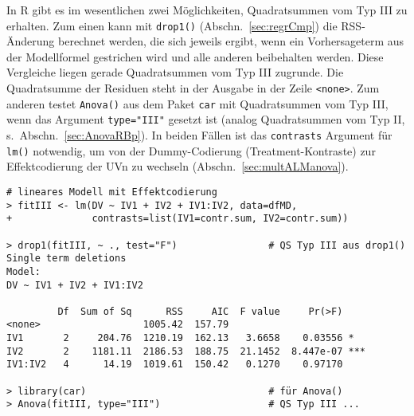 In R gibt es im wesentlichen zwei Möglichkeiten, Quadratsummen vom Typ III zu erhalten. Zum einen kann mit \lstinline!drop1()! (Abschn.\ \ref{sec:regrCmp}) die RSS-Änderung berechnet werden, die sich jeweils ergibt, wenn ein Vorhersageterm aus der Modellformel gestrichen wird und alle anderen beibehalten werden. Diese Vergleiche liegen gerade Quadratsummen vom Typ III zugrunde. Die Quadratsumme der Residuen steht in der Ausgabe in der Zeile \lstinline!<none>!. Zum anderen testet \lstinline!Anova()! aus dem Paket \lstinline!car! mit Quadratsummen vom Typ III, wenn das Argument \lstinline!type="III"! gesetzt ist (analog Quadratsummen vom Typ II, s.\ Abschn.\ \ref{sec:AnovaRBp}). In beiden Fällen ist das \lstinline!contrasts! Argument für \lstinline!lm()! notwendig, um von der Dummy-Codierung (Treatment-Kontraste) zur Effektcodierung der UVn zu wechseln (Abschn.\ \ref{sec:multALManova}).
\begin{lstlisting}
# lineares Modell mit Effektcodierung
> fitIII <- lm(DV ~ IV1 + IV2 + IV1:IV2, data=dfMD,
+              contrasts=list(IV1=contr.sum, IV2=contr.sum))

> drop1(fitIII, ~ ., test="F")                # QS Typ III aus drop1()
Single term deletions
Model:
DV ~ IV1 + IV2 + IV1:IV2

         Df  Sum of Sq      RSS     AIC  F value     Pr(>F)
<none>                  1005.42  157.79
IV1       2     204.76  1210.19  162.13   3.6658    0.03556 *
IV2       2    1181.11  2186.53  188.75  21.1452  8.447e-07 ***
IV1:IV2   4      14.19  1019.61  150.42   0.1270    0.97170

> library(car)                                # für Anova()
> Anova(fitIII, type="III")                   # QS Typ III ...
\end{lstlisting}

